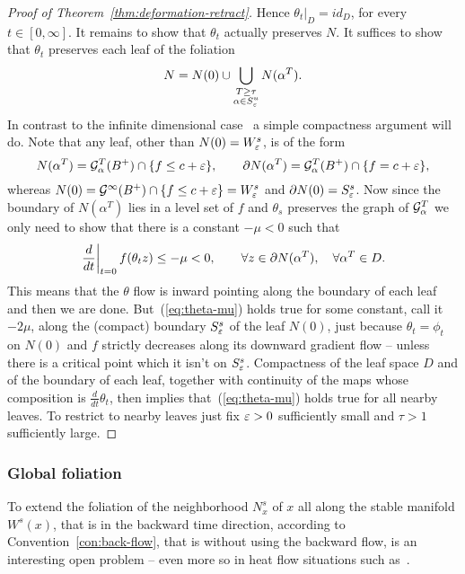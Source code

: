 \documentclass{article}
\begin{document}
\begin{proof}[Proof of Theorem~\ref{thm:deformation-retract}]
Hence $\theta_t|_D=id_D$, for every $t\in[0,\infty]$.
%
It remains to show that $\theta_t$ actually preserves $N$.
It suffices to show that $\theta_t$ preserves each leaf of the foliation
$$
     N=N(0)\cup
     \bigcup_{\substack{T\ge\tau\\\alpha\in S^u_{\varepsilon}}}
     N(\alpha^T).
$$
In contrast to the infinite dimensional case~\cite{weber:2014c} a
simple compactness argument will do.
Note that any leaf, other than $N(0)=W^s_{\varepsilon}$, is of the form
$$
     N(\alpha^T)
     ={\mathcal{G}}^T_\alpha(B^+)\cap\{f\le c+{\varepsilon}\}
     ,\qquad
     {\partial} N(\alpha^T)={\mathcal{G}}^T_\alpha(B^+)\cap\{f=c+{\varepsilon}\},
$$
whereas $N(0)={\mathcal{G}}^\infty(B^+)\cap\{f\le c+{\varepsilon}\}=W^s_{\varepsilon}$ and ${\partial} N(0)=S^s_{\varepsilon}$.
Now since the boundary of $N(\alpha^T)$ lies in a level set of $f$
and $\theta_s$ preserves the graph of ${\mathcal{G}}^T_\alpha$ we only need to
show that there is a constant $-\mu<0$ such that
\begin{equation}\label{eq:theta-mu}
     \left.\frac{d}{dt}\right|_{t=0}f(\theta_t z)
     \le-\mu<0,\qquad
     \forall z\in\p N(\alpha^T),\quad\forall\alpha^T\in D.
\end{equation}
This means that the $\theta$ flow is inward pointing along the
boundary of each leaf and then we are done.
But~(\ref{eq:theta-mu}) holds true for some constant, call it $-2\mu$, along
the (compact) boundary
$S^s_{\varepsilon}$ of the leaf $N(0)$, just because $\theta_t=\phi_t$ on $N(0)$ and $f$
strictly decreases along its downward gradient flow -- unless there is a
critical point which it isn't on $S^s_{\varepsilon}$.
Compactness of the leaf space $D$ and of the boundary of each leaf,
together with continuity of the maps whose composition is $\frac{d}{dt}\theta_t$,
then implies that~(\ref{eq:theta-mu}) holds true for all nearby
leaves. To restrict to nearby leaves just fix ${\varepsilon}>0$
sufficiently small and $\tau>1$ sufficiently large.
\end{proof}


\subsubsection*{Global foliation}%
To extend the foliation of the neighborhood $N_x^s$ of $x$ all along
the stable manifold $W^s(x)$, that is in the backward time direction,
according to Convention~\ref{con:back-flow}, that is without using the backward flow,
is an interesting open problem -- even more so in heat flow situations
such as~\cite{weber:2014c}.
\end{document}
